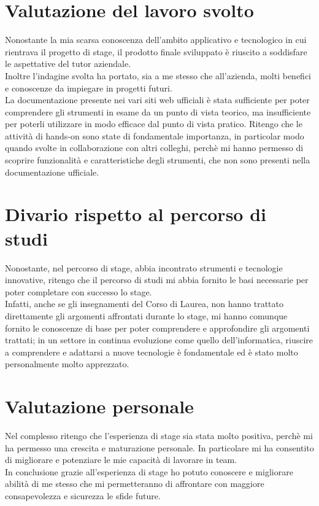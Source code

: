 \section{Valutazione del lavoro svolto}
Nonostante la mia scarsa conoscenza dell'ambito applicativo e tecnologico in cui rientrava il progetto di stage,
il prodotto finale sviluppato è riuscito a soddisfare le aspettative del tutor aziendale.\\
Inoltre l'indagine svolta 
ha portato, sia a me stesso che all'azienda,
 molti benefici e conoscenze da impiegare in progetti futuri.\\
La documentazione presente nei vari siti web ufficiali è stata sufficiente per poter comprendere gli strumenti in esame
da un punto di vista teorico, ma insufficiente 
per poterli utilizzare in modo efficace dal punto di vista pratico. Ritengo che 
le attività di \gls{hands-on}{} sono state di fondamentale importanza, in particolar modo 
quando svolte in collaborazione con altri colleghi, perchè mi hanno permesso di 
scoprire funzionalità e caratteristiche degli strumenti, che non sono presenti nella documentazione ufficiale.\\
\section{Divario rispetto al percorso di studi}
Nonostante, nel percorso di stage, abbia incontrato strumenti e tecnologie innovative, ritengo che il percorso di studi 
mi abbia fornito le basi necessarie per poter completare con successo lo stage.\\
Infatti, anche se gli insegnamenti del Corso di Laurea, non hanno trattato direttamente gli argomenti affrontati durante lo stage,
mi hanno comunque fornito le conoscenze di base per poter comprendere e approfondire gli argomenti trattati;
in un settore in continua evoluzione come quello dell'informatica, riuscire a comprendere e adattarsi a nuove tecnologie è fondamentale ed è 
stato molto personalmente molto apprezzato.
\section{Valutazione personale}
Nel complesso ritengo che l'esperienza di stage sia stata molto positiva, perchè 
mi ha permesso una crescita e maturazione personale. In particolare mi ha consentito di
migliorare e potenziare le mie capacità di lavorare in team.\\
In conclusione grazie all'esperienza di stage ho potuto conoscere e migliorare abilità di me stesso
 che mi permetteranno di affrontare con maggiore consapevolezza e sicurezza le sfide future.\\
\newpage
\pagestyle{empty}
\null %
\newpage